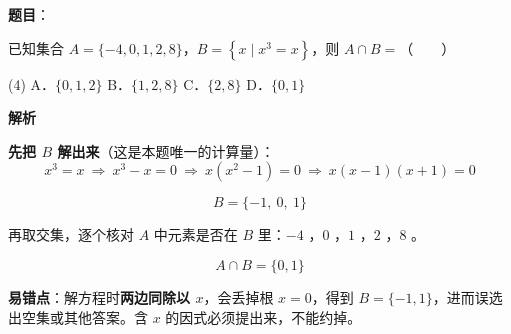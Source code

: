 \begin{answer}

\textbf{题目}：

已知集合 $A=\{-4,0,1,2,8\}$，$B=\left\{x\mid x^3=x\right\}$，则 $A\cap B=$\mbox{（　　）}

\begin{gkopts}(4)
\task A．$\{0,1,2\}$
\task B．$\{1,2,8\}$
\task C．$\{2,8\}$
\task D．$\{0,1\}$
\end{gkopts}

\textbf{解析}

\textbf{先把 $B$ 解出来}（这是本题唯一的计算量）：
\nopagebreak[4]
\[x^3=x\ \Longrightarrow\ x^3-x=0\ \Longrightarrow\ x\left(x^2-1\right)=0\ \Longrightarrow\ x(x-1)(x+1)=0\]

\nopagebreak[4]
\[B=\{-1,\ 0,\ 1\}\]

再取交集，逐个核对 $A$ 中元素是否在 $B$ 里：$-4$ ，$0$ ，$1$ ，$2$ ，$8$ 。

\nopagebreak[4]
\[A\cap B=\{0,1\}\]

\begin{gktip}
\textbf{易错点}：解方程时\textbf{两边同除以 $x$}，会丢掉根 $x=0$，得到 $B=\{-1,1\}$，进而误选出空集或其他答案。含 $x$ 的因式必须提出来，不能约掉。
\end{gktip}


\par\medskip

\end{answer}
